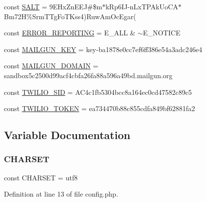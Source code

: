 \begin{DoxyCompactItemize}
\item 
const \hyperlink{config_8php_a6d448b74f10f8080293b329a47a046b4}{S\+A\+LT} = \textquotesingle{}9\+E\+Hx\+Zn\+E\+E\+J\#\$m$\ast$k\+Rp6\+I\+J-\/n\+Lx\+T\+P\+Ak\+Uo\+C\+A$\ast$\+Bm72\+H\%\+Srm\+T\+Tg\+Fo\+T\+Kss4)\+Ruw\+Am\+Oc\+Egar(\textquotesingle{}
\item 
const \hyperlink{config_8php_a80c2f40a4ce1ad3cbfb1978239f63c31}{E\+R\+R\+O\+R\+\_\+\+R\+E\+P\+O\+R\+T\+I\+NG} = E\+\_\+\+A\+LL \& $\sim$E\+\_\+\+N\+O\+T\+I\+CE
\item 
const \hyperlink{config_8php_ad320bd8d96c22e094fb9b774f269aaef}{M\+A\+I\+L\+G\+U\+N\+\_\+\+K\+EY} = \textquotesingle{}key-\/ba1878e0cc7ef6ff386e54a3adc246e4\textquotesingle{}
\item 
const \hyperlink{config_8php_a2de069ac064bb137af53d99e3fcff3c8}{M\+A\+I\+L\+G\+U\+N\+\_\+\+D\+O\+M\+A\+IN} = \textquotesingle{}sandbox5c2500d99acf4cbfa26fa88a596a49bd.\+mailgun.\+org\textquotesingle{}
\item 
const \hyperlink{config_8php_a9b6aafbdebd605cd4fb6f5749b53e59f}{T\+W\+I\+L\+I\+O\+\_\+\+S\+ID} = \textquotesingle{}A\+C4c1fb5304bcc8a164ec0cd47582c89c5\textquotesingle{}
\item 
const \hyperlink{config_8php_a0477d5c66524299f08cae7376eb7884c}{T\+W\+I\+L\+I\+O\+\_\+\+T\+O\+K\+EN} = \textquotesingle{}ea734470b88c855cdfa849bf62881fa2\textquotesingle{}
\end{DoxyCompactItemize}


\subsection{Variable Documentation}
\hypertarget{config_8php_a4ca86066304d2cbb779bd8afd1efe17b}{}\label{config_8php_a4ca86066304d2cbb779bd8afd1efe17b} 
\subsubsection{\texorpdfstring{C\+H\+A\+R\+S\+ET}{CHARSET}}
{\footnotesize\ttfamily const C\+H\+A\+R\+S\+ET = \textquotesingle{}utf8\textquotesingle{}}



Definition at line 13 of file config.\+php.

\hypertarget{config_8php_a545eca516ee397b774b3f8613886fd72}{}\label{config_8php_a545eca516ee397b774b3f8613886fd72} 
